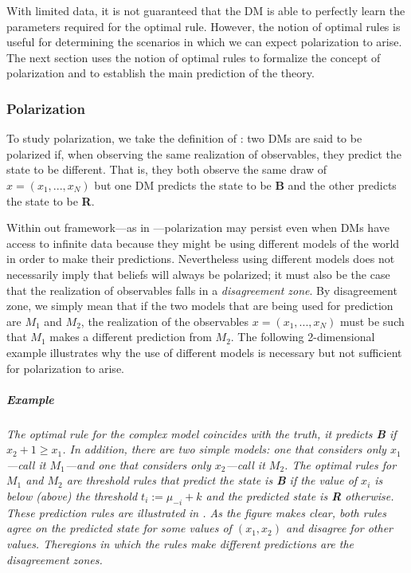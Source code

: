 \documentclass[
  12pt,
]{article}
\begin{document}
With limited data, it is not guaranteed that the DM is able to perfectly
learn the parameters required for the optimal rule. However, the notion
of optimal rules is useful for determining the scenarios in which we can
expect polarization to arise. The next section uses the notion of
optimal rules to formalize the concept of polarization and to establish
the main prediction of the theory.

\hypertarget{polarization}{%
\subsubsection{Polarization}\label{polarization}}

To study polarization, we take the definition of \citet{Haghtalab2021}:
two DMs are said to be polarized if, when observing the same realization
of observables, they predict the state to be different. That is, they
both observe the same draw of \(x=(x_1, ..., x_N)\) but one DM predicts
the state to be \textbf{B} and the other predicts the state to be
\textbf{R}.

Within out framework---as in \citet{Haghtalab2021}---polarization may
persist even when DMs have access to infinite data because they might be
using different models of the world in order to make their predictions.
Nevertheless using different models does not necessarily imply that
beliefs will always be polarized; it must also be the case that the
realization of observables falls in a \emph{disagreement zone}. By
disagreement zone, we simply mean that if the two models that are being
used for prediction are \(M_1\) and \(M_2\), the realization of the
observables \(x=(x_1, ..., x_N)\) must be such that \(M_1\) makes a
different prediction from \(M_2\). The following 2-dimensional example
illustrates why the use of different models is necessary but not
sufficient for polarization to arise.

\hypertarget{example}{%
\subparagraph{Example}\label{example}}

\emph{The optimal rule for the complex model coincides with the truth,
it predicts \textbf{B} if \(x_2+1\geq x_1\). In addition, there are two
simple models: one that considers only \(x_1\)---call it \(M_1\)---and
one that considers only \(x_2\)---call it \(M_2\). The optimal rules for
\(M_1\) and \(M_2\) are threshold rules that predict the state is
\textbf{B} if the value of \(x_i\) is below (above) the threshold
\(t_i := \mu_{-i} + k\) and the predicted state is \textbf{R} otherwise.
These prediction rules are illustrated in . As the figure makes clear,
both rules agree on the predicted state for some values of
\((x_1, x_2)\) and disagree for other values. Theregions in which the
rules make different predictions are the disagreement zones.}
\end{document}

